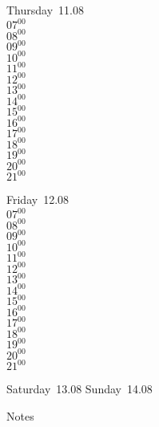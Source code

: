 \documentclass[11pt,a4paper]{book}\usepackage[]{graphicx}\usepackage[]{color}
\begin{document}
\clearpage
\begin{headerbox}
\end{headerbox}
\begin{weekdaybox}
  Thursday~11.08\\
  { 
  \vfill
  $07^{00}$\\
$08^{00}$\\
$09^{00}$\\
$10^{00}$\\
$11^{00}$\\
$12^{00}$\\
$13^{00}$\\
$14^{00}$\\
$15^{00}$\\
$16^{00}$\\
$17^{00}$\\
$18^{00}$\\
$19^{00}$\\
$20^{00}$\\
$21^{00}$\\
  }
\end{weekdaybox} 
\begin{weekdaybox}
  Friday~12.08\\
  { 
  \vfill
  $07^{00}$\\
$08^{00}$\\
$09^{00}$\\
$10^{00}$\\
$11^{00}$\\
$12^{00}$\\
$13^{00}$\\
$14^{00}$\\
$15^{00}$\\
$16^{00}$\\
$17^{00}$\\
$18^{00}$\\
$19^{00}$\\
$20^{00}$\\
$21^{00}$\\
  }
\end{weekdaybox}
\begin{weekendbox}
  Saturday~13.08
  \tcblower
  Sunday~14.08
\end{weekendbox} %
\begin{notebox}
  Notes
\end{notebox}
\clearpage
\end{document}
